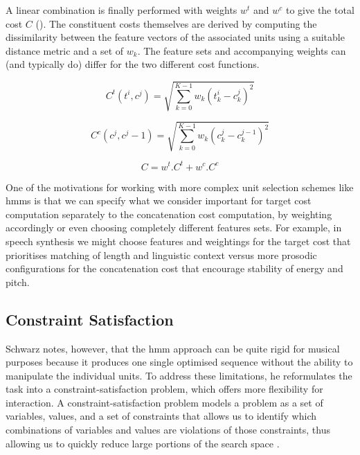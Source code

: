 {{{{{{{A linear combination is finally performed with weights $w^{t}$ and $w^{c}$ to give the total cost $C$ (). The constituent costs themselves are derived by computing the dissimilarity between the feature vectors of the associated units using a suitable distance metric and a set of $w_k$. The feature sets and accompanying weights can (and typically do) differ for the two different cost functions. 

\begin{equation}
\label{eq:target_cost}
C^{t}(t^i, c^j) = \sqrt{\sum_{k=0}^{K-1}w_k(t^i_k-c^j_k)^2}
\end{equation}

\begin{equation}
\label{eq:concatenation_cost}
C^{c}(c^j, c^j-1) = \sqrt{\sum_{k=0}^{K-1}w_k(c^j_k-c^{j-1}_k)^2}
\end{equation}

\begin{equation}
\label{eq:total_cost}
C = w^t.C^t + w^c.C^c
\end{equation}

One of the motivations for working with more complex unit selection schemes like \acrshort{hmm}s is that we can specify what we consider important for target cost computation separately to the concatenation cost computation, by weighting accordingly or even choosing completely different features sets. For example, in speech synthesis we might choose features and weightings for the target cost that prioritises matching of length and linguistic context versus more prosodic configurations for the concatenation cost that encourage stability of energy and pitch.

\subsection{Constraint Satisfaction}

Schwarz notes, however, that the \acrshort{hmm} approach can be quite rigid for musical purposes because it produces one single optimised sequence without the ability to manipulate the individual units. To address these limitations, he reformulates the task into a constraint-satisfaction problem, which offers more flexibility for interaction. A constraint-satisfaction problem models a problem as a set of variables, values, and a set of constraints that allows us to identify which combinations of variables and values are violations of those constraints, thus allowing us to quickly reduce large portions of the search space \citep{Nierhaus2009}. 

}}}}}}}
